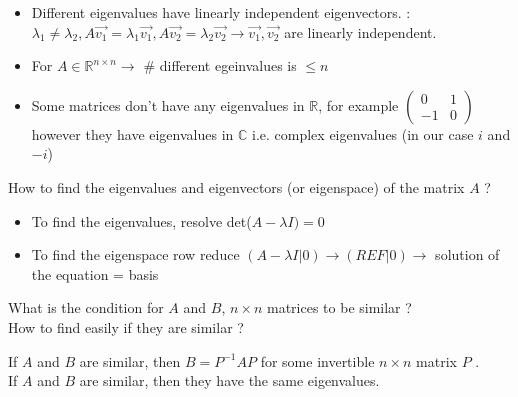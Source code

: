 \documentclass[12pt]{article}
\newcommand*{\xfield}[1]{\begin{mdframed}\centering #1\end{mdframed}\bigskip}
\newenvironment{note}{}{}
\begin{document}
\begin{note}
{\begin{itemize}
		\item Different eigenvalues have linearly independent eigenvectors. :\\
		$\lambda_1 \neq \lambda_2, A\vec{v_1} = \lambda_1 \vec{v_1}, A\vec{v_2} = \lambda_2 \vec{v_2} \rightarrow \vec{v_1},\vec{v_2}$ are linearly independent.
		\item For $A \in \mathbb{R}^{n\times n} \rightarrow$ \# different egeinvalues is $\le n$
		\item Some matrices don't have any eigenvalues in $\mathbb{R}$, for example $\begin{pmatrix}
		0&1\\
		-1&0
		\end{pmatrix}$ however they have eigenvalues in $\mathbb{C}$ i.e. complex eigenvalues (in our case $i$ and $-i$)
	\end{itemize} }  
\end{note}

\begin{note}
	\xfield{How to find the eigenvalues and eigenvectors (or eigenspace) of the matrix $A$ ?}
	\xfield{\begin{itemize}
		\item To find the eigenvalues, resolve det($A - \lambda I) = 0$
		\item To find the eigenspace row reduce $(A-\lambda I | 0) \rightarrow (REF|0) \rightarrow$ solution of the equation = basis
	\end{itemize} }
\end{note}

\begin{note}
	\xfield{What is the condition for $A$ and $B$, $n \times n $ matrices to be similar ?\\
	 How to find easily if they are similar ?}
	\xfield{If $A$ and $B$ are similar, then $B=P^{-1} A P$ for some invertible $n \times n$ matrix $P$ .\\
	 If $A$ and $B$ are similar, then they have the same eigenvalues. }
\end{note}
\end{document}
